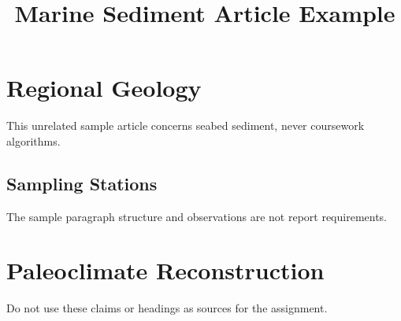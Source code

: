 \documentclass[a4paper,11pt]{article}
\begin{document}
\title{Marine Sediment Article Example}
\maketitle
\section{Regional Geology}
This unrelated sample article concerns seabed sediment, never coursework algorithms.
\subsection{Sampling Stations}
The sample paragraph structure and observations are not report requirements.
\section{Paleoclimate Reconstruction}
Do not use these claims or headings as sources for the assignment.
\end{document}
